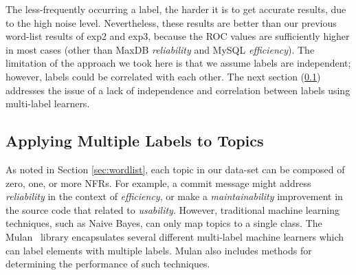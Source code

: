 \documentclass[smallextended]{svjour3}       %
\begin{document}
The less-frequently occurring a label, the harder it is to get accurate
results, due to the high noise level. Nevertheless, these results are
better than our previous word-list results of \textsf{exp2} and
\textsf{exp3}, because the ROC values are sufficiently higher in most
cases (other than MaxDB \emph{reliability} and MySQL \emph{efficiency}). The
limitation of the approach we took here is that we assume labels are
independent; however, labels could be correlated with each other. 
The next section (\ref{sec:multilabel})
addresses the issue of a lack of independence and correlation between
labels
using multi-label learners.


\subsection{Applying Multiple Labels to Topics}
\label{sec:multilabel}

As noted in Section \ref{sec:wordlist}, each topic in our data-set can be composed of zero, one, or more NFRs. 
For example, a commit message might address \textit{reliability} in the context of \textit{efficiency}, or make a \textit{maintainability} improvement in the source code that related to \textit{usability}. 
However, traditional machine learning techniques, such as Naive Bayes, can only map topics to a single class. 
The Mulan~\cite{mulan} library encapsulates several different multi-label machine learners which can label elements with multiple labels.
Mulan also includes methods for determining the performance of such techniques.
\end{document}
